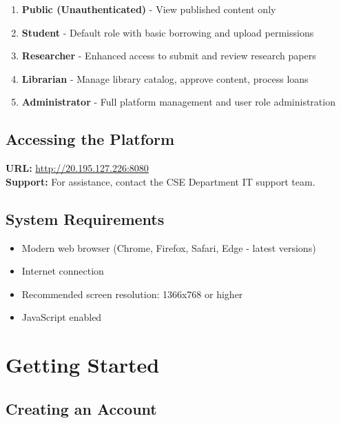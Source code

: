 \documentclass[12pt,a4paper]{article}
\begin{document}
\begin{enumerate}[leftmargin=*]
    \item \textbf{Public (Unauthenticated)} - View published content only
    \item \textbf{Student} - Default role with basic borrowing and upload permissions
    \item \textbf{Researcher} - Enhanced access to submit and review research papers
    \item \textbf{Librarian} - Manage library catalog, approve content, process loans
    \item \textbf{Administrator} - Full platform management and user role administration
\end{enumerate}

\subsection{Accessing the Platform}
\begin{tcolorbox}[colback=blue!5!white,colframe=primarycolor,title=Platform Access]
\textbf{URL:} \url{http://20.195.127.226:8080}\\
\textbf{Support:} For assistance, contact the CSE Department IT support team.
\end{tcolorbox}

\subsection{System Requirements}
\begin{itemize}[leftmargin=*]
    \item Modern web browser (Chrome, Firefox, Safari, Edge - latest versions)
    \item Internet connection
    \item Recommended screen resolution: 1366x768 or higher
    \item JavaScript enabled
\end{itemize}

\newpage

\section{Getting Started}

\subsection{Creating an Account}
\end{document}
